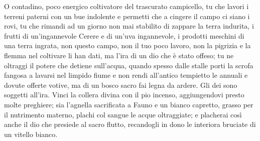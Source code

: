 \documentclass[twoside,12pt]{book}
\begin{document}
\begin{pages}
\begin{Leftside}
	\end{Leftside}
	
	\begin{Rightside}
		\beginnumbering
		\pstart
		\skipnumbering{}
		\pend
		
		\pstart[\\]
		\noindent O contadino, poco energico coltivatore del trascurato campicello, tu che lavori i terreni paterni con un bue indolente e permetti che a cingere il campo ci siano i rovi, tu che rimandi ad un giorno non mai stabilito di zappare la terra indurita, i frutti di un’ingannevole Cerere e di un’uva ingannevole, i prodotti meschini di una terra ingrata, non questo campo, non il tuo poco lavoro, non la pigrizia e la flemma nel coltivare li han dati, ma l’ira di un dio che è stato offeso; 
		\pend
		\pstart
		tu ne oltraggi il potere che detiene sull’acqua, quando spesso dalle stalle porti la scrofa fangosa a lavarsi nel limpido fiume e non rendi all’antico tempietto le annuali e dovute offerte votive, ma di un bosco sacro fai legna da ardere. 
		\pend
		\pstart
		Gli dei sono soggetti all’ira. Vinci la collera divina con il pio incenso, aggiungendovi presto molte preghiere;
		\pend
		\pstart
		sia l’agnella sacrificata a Fauno e un bianco capretto, grasso per il nutrimento materno, plachi col sangue le acque oltraggiate; e placherai così anche il dio che presiede al sacro flutto, recandogli in dono le interiora bruciate di un vitello bianco. 
		\pend
		
		\endnumbering
	\end{Rightside}	
\end{pages}
\Pages 

	
\end{document}
